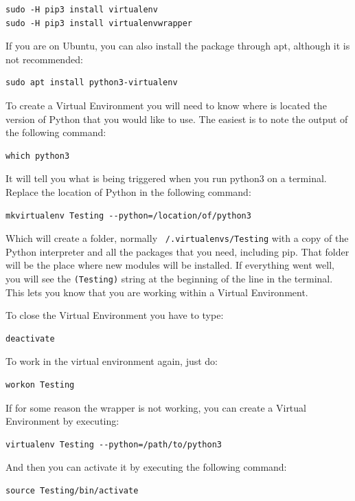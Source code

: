 \begin{verbatim}
sudo -H pip3 install virtualenv
sudo -H pip3 install virtualenvwrapper
\end{verbatim}

If you are on Ubuntu, you can also install the package through apt, although it is not recommended:
\begin{verbatim}
sudo apt install python3-virtualenv
\end{verbatim}

To create a Virtual Environment you will need to know where is located the version of Python that you would like to use. The easiest is to note the output of the following command:

\begin{verbatim}
which python3
\end{verbatim}

It will tell you what is being triggered when you run python3 on a terminal. Replace the location of Python in the following command:
\begin{verbatim}
mkvirtualenv Testing --python=/location/of/python3
\end{verbatim}

Which will create a folder, normally \texttt{~/.virtualenvs/Testing} with a copy of the Python interpreter and all the packages that you need, including pip. That folder will be the place where new modules will be installed. If everything went well, you will see the \texttt{(Testing)} string at the beginning of the line in the terminal. This lets you know that you are working within a Virtual Environment.

To close the Virtual Environment you have to type:

\begin{verbatim}
deactivate
\end{verbatim}

To work in the virtual environment again, just do:
\begin{verbatim}
workon Testing
\end{verbatim}

If for some reason the wrapper is not working, you can create a Virtual Environment by executing:
\begin{verbatim}
virtualenv Testing --python=/path/to/python3
\end{verbatim}
And then you can activate it by executing the following command:
\begin{verbatim}
source Testing/bin/activate 
\end{verbatim}

